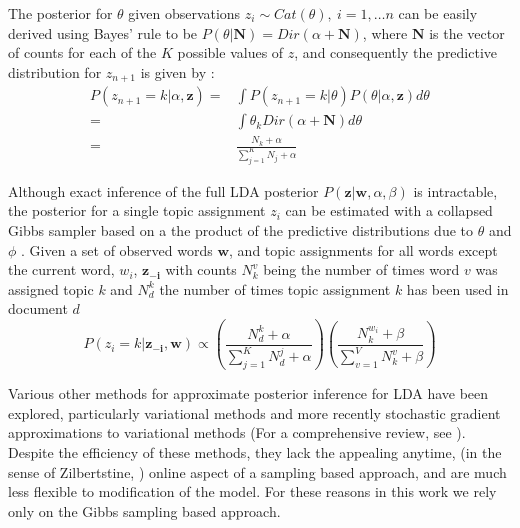 The posterior for $\theta$ given observations $z_i \sim Cat(\theta),~i = 1, \ldots n$ can be easily derived using Bayes' rule to be $P(\theta | \boldsymbol{N}) = Dir(\alpha + \boldsymbol{N})$, where $\boldsymbol{N}$ is the vector of counts for each of the $K$ possible values of $z$, and consequently the predictive distribution for $z_{n+1}$ is given by \citep{BishopCh2}:
\begin{equation}
\begin{split}
P(z_{n+1}=k | \alpha, \boldsymbol{z}) =& \int P(z_{n+1}=k | \theta) P(\theta | \alpha, \boldsymbol{z}) d\theta\\
=& \int \theta_k Dir(\alpha + \boldsymbol{N}) d\theta\\
=& \frac{N_k + \alpha}{\sum_{j=1}^K N_j + \alpha}
\end{split}
\end{equation}

Although exact inference of the full LDA posterior $P(\boldsymbol{z} | \boldsymbol{w}, \alpha, \beta)$ is intractable, the posterior for a single topic assignment $z_i$ can be estimated with a collapsed Gibbs sampler based on a the product of the predictive distributions due to $\theta$ and $\phi$ \citep{griffiths2004}. Given a set of observed words $\textbf{w}$, and topic assignments for all words except the current word, $w_i$, $\boldsymbol{z_{-i}}$ with counts $N^v_k$ being the number of times word $v$ was assigned topic $k$ and $N^k_d$ the number of times topic assignment $k$ has been used in document $d$
\begin{equation} \label{eqn:posterior}
P(z_i = k | \boldsymbol{z_{-i}}, \boldsymbol{w}) \propto \left(\frac{N^k_d + \alpha}{\sum_{j=1}^K N^j_d + \alpha}\right)
   \left( \frac{N^{w_i}_k + \beta}{\sum_{v=1}^V N^v_k + \beta} \right)
\end{equation}

Various other methods for approximate posterior inference for LDA have been explored, particularly variational methods and more recently stochastic gradient approximations to variational methods (For a comprehensive review, see \citep{geigle2016}). Despite the efficiency of these methods, they lack the appealing anytime,
(in the sense of Zilbertstine, \citep{zilberstein1996anytime})
online aspect of a sampling based approach, and are much less flexible to modification of the model. For these reasons in this work we rely only on the Gibbs sampling based approach.

